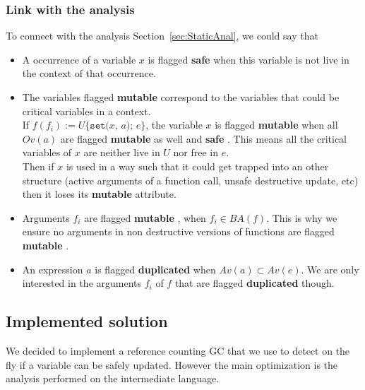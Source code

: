 \documentclass[12pt,a4paper]{article}
\newcommand{\cl}[1]{\texttt{#1}}
\newcommand{\bang}{\textbf{mutable }}
\newcommand{\safe}{\textbf{safe }}
\newcommand{\dupl}{\textbf{duplicated }}
\newcommand{\ucont}[1]{\{#1\}}
\begin{document}
\newpage
\subsubsection*{Link with the analysis}

To connect with the analysis Section~\ref{sec:StaticAnal}, we could say that
\begin{itemize}
\item A occurrence of a variable $x$ is flagged \safe when this variable is not live in the context of that occurrence.

\item The variables flagged \bang correspond to the variables that could be critical variables in a context. \\

If $f(f_i) := U\ucont{\cl{set(}x\cl{, }a\cl{); }e}$, the variable $x$ is flagged \bang when all $Ov(a)$ are flagged \bang as well and \safe. This means all the critical variables of $x$ are neither live in $U$ nor free in $e$.\\
Then if $x$ is used in a way such that it could get trapped into an other structure (active arguments of a function call, unsafe destructive update, etc) then it loses its \bang attribute.

\item Arguments $f_i$ are flagged \bang, when $f_i \in BA(f)$. This is why we ensure no arguments in non destructive versions of functions are flagged \bang.

\item An expression $a$ is flagged \dupl when $Av(a) \subset Av(e)$. We are only interested in the arguments $f_i$ of $f$ that are flagged \dupl though.
\end{itemize}






\subsection{Implemented solution}

We decided to implement a reference counting GC that we use to detect on the fly if a variable can be safely updated. However the main optimization is the analysis performed on the intermediate language. \\
\end{document}
